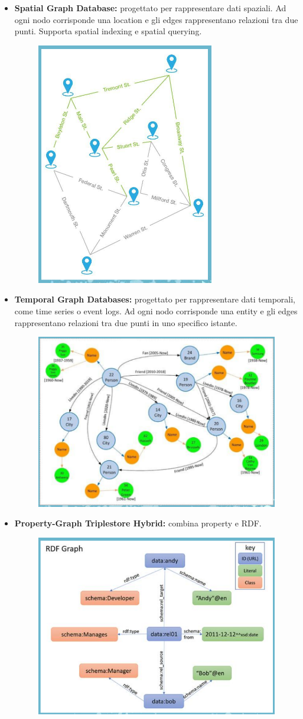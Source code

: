 \begin{itemize}
\begin{figure}[th]
    \end{figure}
    \item \textbf{Spatial Graph Database:} progettato per rappresentare dati spaziali. Ad ogni nodo corrisponde una location e gli edges rappresentano relazioni tra due punti. Supporta spatial indexing e spatial querying.
    \\
    \begin{figure}[th]
        \centering
        \includegraphics[width=0.25\linewidth]{GraphDatabase//img/positionaldb.png}
    \end{figure}
    \item \textbf{Temporal Graph Databases:} progettato per rappresentare dati temporali, come time series o event logs. Ad ogni nodo corrisponde una entity e gli edges rappresentano relazioni tra due punti in uno specifico istante.
    \\
    \begin{figure}[th]
        \centering
        \includegraphics[width=0.45\linewidth]{GraphDatabase//img/temporaldb.png}
    \end{figure}
    \item \textbf{Property-Graph Triplestore Hybrid:} combina property e RDF.
    \\
    \begin{figure}[th]
        \centering
        \includegraphics[width=0.35\linewidth]{GraphDatabase//img/rdfmixdb.png}
    \end{figure}
\end{itemize}

